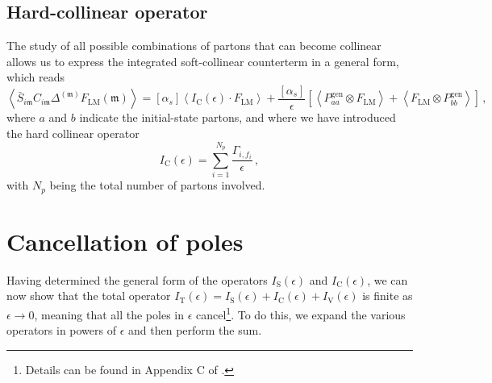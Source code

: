 \documentclass[a4paper, 12pt]{book}
\newcommand{\um}{\mathfrak{m}}
\begin{document}
\subsection{Hard-collinear operator}
The study of all possible combinations of partons that can become collinear allows us to express the integrated soft-collinear counterterm in a general form, which reads
\begin{equation}
  \left< \bar{S}_{i\um} C_{i\um} \Delta^{(\um)} F_{\mathrm{LM}}(\um)\right> = [\alpha_s] \left< I_{\mathrm{C}}(\epsilon) \cdot F_{\mathrm{LM}} \right> + \frac{[\alpha_s]}{\epsilon} \left[\left< P_{aa}^{\mathrm{gen}} \otimes F_{\mathrm{LM}} \right> + \left< F_{\mathrm{LM}} \otimes P_{bb}^{\mathrm{gen}}  \right>\right] \, , 
  \label{soft-collinear-integrated}
\end{equation}
where $a$ and $b$  indicate the initial-state partons, and where we have introduced the hard collinear operator
\begin{equation}
  I_{\mathrm{C}}(\epsilon) = \sum_{i=1}^{N_p} \frac{\Gamma_{i,f_i}}{\epsilon}  \, ,
  \label{IC-def}
\end{equation}
with $N_p$  being the total number of partons involved.

\section{Cancellation of poles}
\label{pole-cancellation-section}
Having determined the general form of the operators $I_{\mathrm{S}}(\epsilon)$ and $I_{\mathrm{C}}(\epsilon)$, we can now show that the total operator $I_{\mathrm{T}} (\epsilon)=I_{\mathrm{S}}(\epsilon)+I_{\mathrm{C}}(\epsilon)+I_{\mathrm{V}}(\epsilon)$ is finite as $\epsilon \to 0$, meaning that all the poles in $\epsilon$ cancel\footnote{Details can be found in Appendix C of \cite{Devoto:2025kin}.}. To do this, we expand the various operators in powers of $\epsilon$ and then perform the sum. \\
\end{document}
